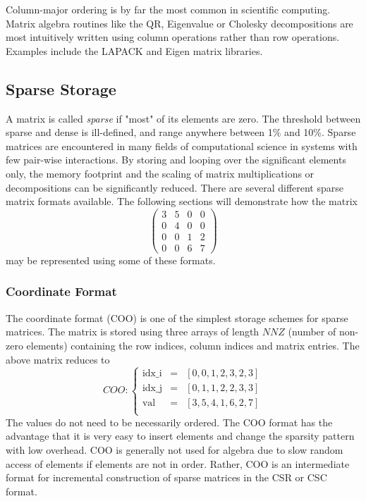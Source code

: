 Column-major ordering is by far the most common in scientific computing. Matrix algebra routines like the QR, Eigenvalue or Cholesky decompositions are most intuitively written using column operations rather than row operations. Examples include the LAPACK and Eigen matrix libraries. 

\subsection{Sparse Storage}

A matrix is called \emph{sparse} if "most" of its elements are zero. The threshold between sparse and dense is ill-defined, and range anywhere between 1\% and 10\%. Sparse matrices are encountered in many fields of computational science in systems with few pair-wise interactions. By storing and looping over the significant elements only, the memory footprint and the scaling of matrix multiplications or decompositions can be significantly reduced. There are several different sparse matrix formats available. The following sections will demonstrate how the matrix
\begin{equation*}
\begin{pmatrix}
3 & 5 & 0 & 0 \\
0 & 4 & 0 & 0 \\
0 & 0 & 1 & 2 \\
0 & 0 & 6 & 7 
\end{pmatrix}
\end{equation*}
\noindent may be represented using some of these formats.

\subsubsection{Coordinate Format}

The coordinate format (COO) is one of the simplest storage schemes for sparse matrices. The matrix is stored using three arrays of length $NNZ$ (number of non-zero elements) containing the row indices, column indices and matrix entries. The above matrix reduces to 
\begin{equation*}
COO: \left\lbrace
\begin{matrix}
\textrm{idx\_i} &= &\left[ 0, 0, 1, 2, 3, 2, 3 \right] \\
\textrm{idx\_j} &= &\left[ 0, 1, 1, 2, 2, 3, 3 \right] \\
\textrm{val}   &= &\left[ 3, 5, 4, 1, 6, 2, 7 \right] \\
\end{matrix}
\right.
\end{equation*}
\noindent The values do not need to be necessarily ordered. The COO format has the advantage that it is very easy to insert elements and change the sparsity pattern with low overhead. COO is generally not used for algebra due to slow random access of elements if elements are not in order. Rather, COO is an intermediate format for incremental construction of sparse matrices in the CSR or CSC format.

